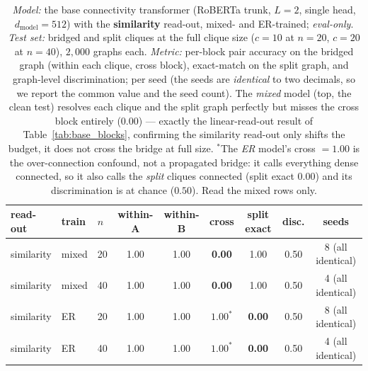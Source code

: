 \documentclass[11pt,a4paper]{article}
\begin{document}
\begin{table}[H]\centering\small
\begin{tabular}{lllcccccc}
\toprule
read-out & train & $n$ & within-A & within-B & cross & split exact & disc. & seeds \\
\midrule
similarity & mixed & 20 & 1.00 & 1.00 & \textbf{0.00} & 1.00 & 0.50 & 8 (all identical) \\
similarity & mixed & 40 & 1.00 & 1.00 & \textbf{0.00} & 1.00 & 0.50 & 4 (all identical) \\
\midrule
similarity & ER & 20 & 1.00 & 1.00 & $1.00^\ast$ & \textbf{0.00} & 0.50 & 8 (all identical) \\
similarity & ER & 40 & 1.00 & 1.00 & $1.00^\ast$ & \textbf{0.00} & 0.50 & 4 (all identical) \\
\bottomrule
\end{tabular}
\caption{\emph{Model:} the base connectivity transformer (RoBERTa trunk, $L=2$, single head,
$d_{\mathrm{model}}=512$) with the \textbf{similarity} read-out, mixed- and ER-trained;
\emph{eval-only}. \emph{Test set:} bridged and split cliques at the full clique size ($c=10$ at
$n=20$, $c=20$ at $n=40$), $2{,}000$ graphs each. \emph{Metric:} per-block pair accuracy on the
bridged graph (within each clique, cross block), exact-match on the split graph, and graph-level
discrimination; per seed (the seeds are \emph{identical} to two decimals, so we report the common
value and the seed count). The \emph{mixed} model (top, the clean test) resolves each clique and the
split graph perfectly but misses the cross block entirely ($0.00$) --- exactly the linear-read-out
result of Table~\ref{tab:base_blocks}, confirming the similarity read-out only shifts the budget, it
does not cross the bridge at full size. $^\ast$The \emph{ER} model's cross $=1.00$ is the
over-connection confound, not a propagated bridge: it calls everything dense connected, so it also
calls the \emph{split} cliques connected (split exact $0.00$) and its discrimination is at chance
($0.50$). Read the mixed rows only.}
\label{tab:sim_blocks}
\end{table}
\end{document}
